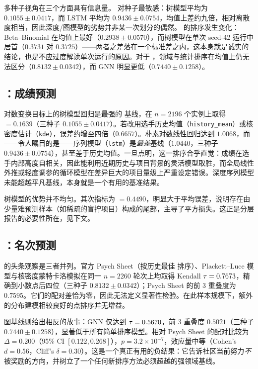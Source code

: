多种子视角在三个方面具有信息量。 对种子最敏感：树模型平均为 $0.1055\pm0.0417$，而 LSTM 平均为 $0.9436\pm0.0754$，均值上差约九倍，相对离散度相当，因此深度/图模型的劣势并非某一次划分的偶然。 的排序发生变化：Beta--Binomial 在均值上最好（$0.2938\pm0.0570$），而树模型在单次 seed-42 运行中居首（$0.3731$ 对 $0.3725$）——两者之差落在一个标准差之内，这本身就是诚实的结论，也是不应过度解读单次运行的原因。对于 ，领域与统计排序在均值上仍无法区分（$0.8132\pm0.0342$），而 GNN 明显更低（$0.7440\pm0.1258$）。

\subsection{：成绩预测}
\label{sec:results-t1}

对数变换目标上的树模型回归是最强的  基线，在 $n=2196$ 个实例上取得 \maelog{} $=0.1639$（三种子 $0.1055\pm0.0417$）。若改用选手历史均值（\texttt{history\_mean}）或核密度估计（\texttt{kde}），误差约增至四倍（$0.6657$）。朴素对数线性回归达到 $1.0068$，而——令人瞩目的是——序列模型（\texttt{lstm}）是\emph{最差}基线（$1.0440$，三种子 $0.9436\pm0.0754$），甚至差于历史均值。一旦点明，这一排序合乎直觉：成绩在选手内部高度自相关，因此能利用近期历史与项目背景的灵活模型取胜，而全局线性外推或轻度调参的循环模型在差异巨大的项目量级上严重设定错误。深度序列模型未能超越平凡基线，本身就是一个有用的基准结果。

树模型的优势并不均匀。其次指标为 \rmselog{} $=0.4490$，明显大于平均误差，说明存在由少量难预测样本（如稀疏的盲拧项目）构成的尾部，主导了平方损失。这正是分层报告的必要性所在，见下文。

\subsection{：名次预测}
\label{sec:results-t2}

 的头条观察是三者并列。官方 \wca{} Psych Sheet（按历史最佳  排序）、Plackett--Luce 模型与核密度蒙特卡洛模拟在同一 $n=2260$ 轮次上均取得 Kendall $\tau=0.7673$，精确到小数点后四位（三种子 $0.8132\pm0.0342$）；Psych Sheet 的前 3 重叠度为 $0.7595$。它们的配对差恰为零，因此无法定义显著性检验。在此样本规模下，额外的分布建模相较良好的点排序并无增益。

图基线则给出相反的故事：GNN 仅达到 $\tau=0.5670$，前 3 重叠度 $0.5021$（三种子 $0.7440\pm0.1258$），显著低于所有简单排序模型。相对 Psych Sheet 的配对比较为 $\Delta=0.200$（95\% CI $[0.122,0.268]$），$p=3.2\times10^{-7}$，效应量中等（Cohen's $d=0.56$，Cliff's $\delta=0.30$）。这是一个真正有用的负结果：它告诉社区当前努力\emph{不}被奖励的方向，并树立了一个任何新排序方法必须超越的强领域基线。

